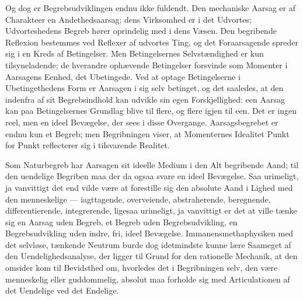 \documentclass[12pt,a4paper]{book}
\begin{document}
Og dog er Begrebsudviklingen endnu ikke fuldendt. Den mechaniske Aarsag
er af Charakteer en Andethedsaarsag; dens Virksomhed er i det Udvortes;
Udvorteshedens Begreb hører oprindelig med i dens Væsen. Den begribende
Reflexion bestemmes ved Reflexer af udvortes Ting, og det Foraarsagende
spreder sig i en Kreds af Betingelser. Men Betingelsernes
Selvstændighed er kun tilsyneladende; de hverandre ophævende
Betingelser forsvinde som Momenter i Aarsagens Eenhed, det Ubetingede.
Ved at optage Betingelserne i Ubetingethedens Form er Aarsagen i sig
selv betinget, og det saaledes, at den indenfra af sit Begrebsindhold
kan udvikle sin egen Forskjellighed: een Aarsag kan
paa Betingelsernes Grundlag blive til flere, og flere igjen til een.
Det er ingen reel, men en ideel Bevægelse, der sees i disse Overgange.
Aarsagsbegrebet er endnu kun et Begreb; men Begribningen viser, at
Momenternes Idealitet Punkt for Punkt reflecterer sig i tilsvarende
Realitet.

Som Naturbegreb har Aarsagen sit ideelle Medium i den Alt begribende
Aand; til den uendelige Begriben maa der da ogsaa svare en ideel
Bevægelse. Saa urimeligt, ja vanvittigt det end vilde være at forestille
sig den absolute Aand i Lighed med den menneskelige --- iagttagende,
overveiende, abstraherende, beregnende, differentierende, integrerende,
ligesaa urimeligt, ja vanvittigt er det at ville tænke sig en Aarsag
uden Begreb, et Begreb uden Begrebsudvikling, en Begrebsudvikling uden
indre, fri, ideel Bevægelse. Immanensmethaphysiken med det selvløse,
tænkende Neutrum burde dog idetmindste kunne lære Saameget af den
Uendelighedsanalyse, der ligger til Grund for den rationelle Mechanik,
at den omsider kom til Bevidsthed om, hvorledes det i Begribningen
selv, den være menneskelig eller guddommelig, absolut maa forholde sig
med Articulationen af det Uendelige ved det Endelige.
\end{document}

